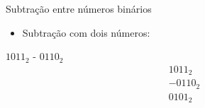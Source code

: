 
\begin{frame}{Subtração entre números binários}
    \begin{itemize}
        \item Subtração com dois números:
    \end{itemize}
    $1011_{2}$ - $0110_{2}$ \\[0.2cm]
    \[ \begin{array}{r} 1011_{2} \\ - 0110_{2} \\ \hline 0101_{2} \end{array} \]
\end{frame}